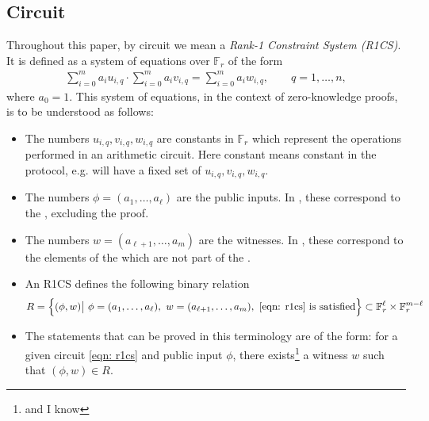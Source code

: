 
\subsection{Circuit}
Throughout this paper, by circuit we mean a \emph{Rank-1 Constraint System (R1CS)}. It is defined as a system of equations over $\mathbb{F}_r$ of the form 
\begin{align}
\sum_{i=0}^m a_i u_{i, q} \cdot \sum_{i=0}^m a_i v_{i, q} = \sum_{i=0}^m a_i w_{i, q}, \qquad q = 1, \dots, n, \label{eqn: r1cs}
\end{align}
where $a_0 = 1$. This system of equations, in the context of zero-knowledge proofs, is to be understood as follows:
\begin{itemize}
\item The numbers $u_{i, q}, v_{i, q}, w_{i, q}$ are constants in $\mathbb{F}_r$ which represent the operations performed in an arithmetic circuit. Here constant means constant in the protocol, e.g. \MantaPay{} will have a fixed set of $u_{i, q}, v_{i, q}, w_{i, q}$.
\item The numbers $\phi = (a_1, \dots, a_\ell)$ are the public inputs. In \MantaPay{}, these correspond to the \TransferPost{}, excluding the proof.
\item The numbers $w = (a_{\ell + 1}, \dots, a_m)$ are the witnesses. In \MantaPay{}, these correspond to the elements of the \Transfer{} which are not part of the \TransferPost{}.
\item An R1CS defines the following binary relation
\begin{align}
R = \left\{ (\phi, w) \big| \ \phi = (a_1, \dots, a_\ell), \ w = (a_{\ell + 1}, \dots, a_m), \ \eqref{eqn: r1cs} \textrm{ is satisfied} \right\} \subset \mathbb{F}_r^\ell \times \mathbb{F}_r^{m-\ell}
\end{align}
\item The statements that can be proved in this terminology are of the form: for a given circuit \eqref{eqn: r1cs} and public input $\phi$, there exists\footnote{and I know} a witness $w$ such that $(\phi, w) \in R$.
\end{itemize}

